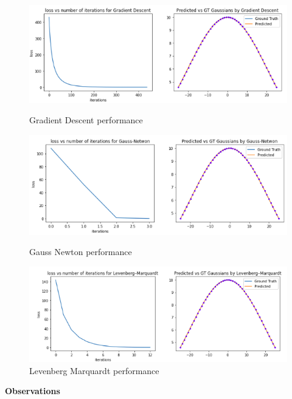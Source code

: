\documentclass[journal]{IEEEtran}
\begin{document}
\begin{figure}%
\centering
\includegraphics[width=.9\linewidth]{Figures/GD}
\caption{Gradient Descent performance}
\label{table:Comparison}

\centering
\includegraphics[width=.9\linewidth]{Figures/GN}
\caption{Gauss Newton performance}
\label{table:Comparison}


\centering
\includegraphics[width=.9\linewidth]{Figures/LM}
\caption{Levenberg Marquardt performance}
\label{table:Comparison}
\end{figure}
\textbf{Observations}
\end{document}

